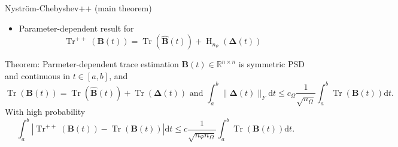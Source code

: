 \documentclass[aspectratio=169, leqno, 12pt]{beamer}
\newcommand{\mtx}[1]{\boldsymbol{#1}}
\DeclareMathOperator{\Tr}{Tr}
\DeclareMathOperator{\Hutch}{H}
\begin{document}
\begin{frame}{Nystr\"om-Chebyshev++ (main theorem)}
    \begin{itemize}
        \item Parameter-dependent result for \cite{meyer2021hutch}
        \begin{equation}
            \Tr^{++}(\mtx{B}(t)) = \Tr(\widehat{\mtx{B}}(t)) + \Hutch_{n_{\Psi}}(\mtx{\Delta}(t))
        \end{equation}
    \end{itemize}
    \begin{block}{Theorem: Parmeter-dependent trace estimation}
        $\mtx{B}(t) \in \mathbb{R}^{n \times n}$ is symmetric \gls{PSD}
        and continuous in $t \in [a, b]$, and
        \begin{equation}
            \Tr(\mtx{B}(t)) = \Tr(\widehat{\mtx{B}}(t)) + \Tr(\mtx{\Delta}(t)) \text{ and } \int_{a}^{b} \lVert \mtx{\Delta}(t) \rVert _F \mathrm{d}t \leq c_{\Omega} \frac{1}{\sqrt{n_{\Omega}}} \int_{a}^{b} \Tr(\mtx{B}(t)) \mathrm{d}t.
        \end{equation}
        With high probability
        \begin{equation}
            \int_{a}^{b} |\Tr^{++}(\mtx{B}(t)) - \Tr(\mtx{B}(t))| \mathrm{d}t \leq c \frac{1}{\sqrt{n_{\Psi} n_{\Omega}}} \int_{a}^{b} \Tr(\mtx{B}(t)) \mathrm{d}t.
        \end{equation}
    \end{block}
\end{frame}
\end{document}
